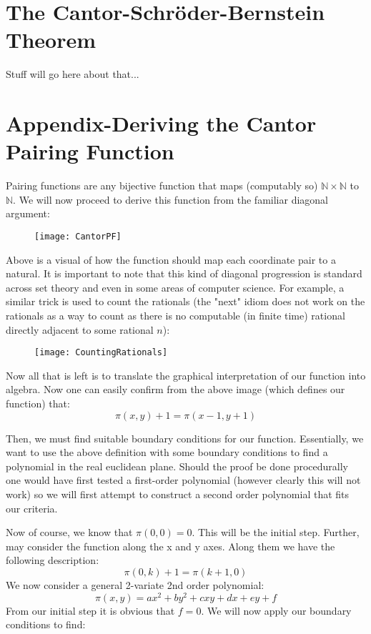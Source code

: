 \documentclass{article}
\begin{document}
\section{The Cantor-Schr\"oder-Bernstein Theorem}
Stuff will go here about that...
\section{Appendix-Deriving the Cantor Pairing Function}
\par Pairing functions are any bijective function that maps (computably so) $\mathbb{N} \times \mathbb{N}$ to $\mathbb{N}$. We will now proceed to derive this function from the familiar diagonal argument: 
\begin{figure}[h]
\texttt{[image: CantorPF]}
\centering
\end{figure}
\par Above is a visual of how the function should map each coordinate pair to a natural. It is important to note that this kind of diagonal progression is standard across set theory and even in some areas of computer science. For example, a similar trick is used to count the rationals (the "next" idiom does not work on the rationals as a way to count as there is no computable (in finite time) rational directly adjacent to some rational $n$): 
\begin{figure}[h]
\texttt{[image: CountingRationals]}
\centering
\end{figure}
\par Now all that is left is to translate the graphical interpretation of our function into algebra. Now one can easily confirm from the above image (which defines our function) that:
\[
\pi (x,y)+1=\pi (x-1,y+1)
\]
\par Then, we must find suitable boundary conditions for our function. Essentially, we want to use the above definition with some boundary conditions to find a polynomial in the real euclidean plane. Should the proof be done procedurally one would have first tested a first-order polynomial (however clearly this will not work) so we will first attempt to construct a second order polynomial that fits our criteria. 
\par Now of course, we know that $\pi(0,0)=0$. This will be the initial step. Further, may consider the function along the x and y axes. Along them we have the following description:
\[
\pi (0,k)+1=\pi (k+1,0)
\]
We now consider a general 2-variate 2nd order polynomial:
\[
\pi (x,y)=ax^{2}+by^{2}+cxy+dx+ey+f
\]
From our initial step it is obvious that $f=0$. We will now apply our boundary conditions to find:
\end{document}
